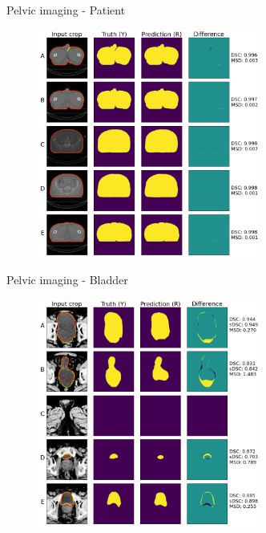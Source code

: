 \documentclass[9pt]{beamer}
\begin{document}
\begin{frame}{Pelvic imaging - Patient}
  \begin{figure}
    \includegraphics[width=0.65\textwidth]{images/prostate_patient}
  \end{figure}
\end{frame}
%
\begin{frame}{Pelvic imaging - Bladder}
  \begin{figure}
    \includegraphics[width=0.65\textwidth]{images/prostate_bladder}
  \end{figure}
\end{frame}
\end{document}

